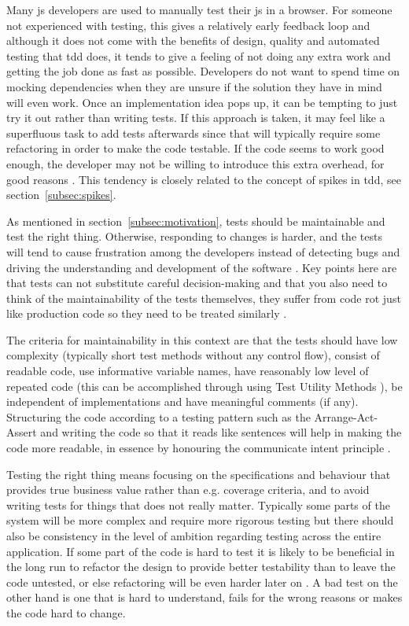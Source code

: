 \documentclass[11pt]{article}
\begin{document}
Many \gls{js} developers are used to manually test their \gls{js} in a browser. For someone not experienced with testing, this gives a relatively early feedback loop and although it does not come with the benefits of design, quality and automated testing that \gls{tdd} does, it tends to give a feeling of not doing any extra work and getting the job done as fast as possible. Developers do not want to spend time on mocking dependencies when they are unsure if the solution they have in mind will even work. Once an implementation idea pops up, it can be tempting to just try it out rather than writing tests. If this approach is taken, it may feel like a superfluous task to add tests afterwards since that will typically require some refactoring in order to make the code testable. If the code seems to work good enough, the developer may not be willing to introduce this extra overhead, for good reasons \cite[question~43]{Stenmark}. This tendency is closely related to the concept of spikes in \gls{tdd}, see section~\ref{subsec:spikes}.

As mentioned in section~\ref{subsec:motivation}, tests should be maintainable and test the right thing. Otherwise, responding to changes is harder, and the tests will tend to cause frustration among the developers instead of detecting bugs and driving the understanding and development of the software \cite{Clean}. Key points here are that tests can not substitute careful decision-making and that you also need to think of the maintainability of the tests themselves, they suffer from code rot just like production code so they need to be treated similarly \cite[question~36]{Ahnve}\cite[p.~123-133]{Clean}.

The criteria for maintainability in this context are that the tests should have low complexity (typically short test methods without any control flow), consist of readable code, use informative variable names, have reasonably low level of repeated code (this can be accomplished through using Test Utility Methods \cite[599]{TestPatterns}), be independent of implementations and have meaningful comments (if any). Structuring the code according to a testing pattern such as the Arrange-Act-Assert \cite{C2} and writing the code so that it reads like sentences will help in making the code more readable, in essence by honouring the communicate intent principle \cite[p.~41]{TestPatterns}.

Testing the right thing means focusing on the specifications and behaviour that provides true business value rather than e.g. coverage criteria, and to avoid writing tests for things that does not really matter. Typically some parts of the system will be more complex and require more rigorous testing but there should also be consistency in the level of ambition regarding testing across the entire application. If some part of the code is hard to test it is likely to be beneficial in the long run to refactor the design to provide better testability than to leave the code untested, or else refactoring will be even harder later on \cite{Refactoring}. A bad test on the other hand is one that is hard to understand, fails for the wrong reasons or makes the code hard to change.
\end{document}
